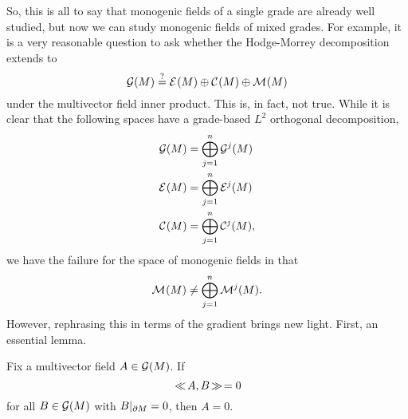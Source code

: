 So, this is all to say that monogenic fields of a single grade are already well studied, but now we can study monogenic fields of mixed grades. For example, it is a very reasonable question to ask whether the Hodge-Morrey decomposition extends to
    \begin{equation}
        \mathcal{G}(M) \stackrel{?}{=} \mathcal{E}^{}(M) \oplus \mathcal{C}^{}(M) \oplus \mathcal{M}^{}(M)
    \end{equation} 
under the multivector field inner product. This is, in fact, not true.  While it is clear that the following spaces have a grade-based $L^2$ orthogonal decomposition,
\begin{align}
    \mathcal{G}(M) &= \bigoplus_{j=1}^n \mathcal{G}^j(M)\\
    \mathcal{E}^{}(M) &= \bigoplus_{j=1}^n \mathcal{E}^{j}(M)\\
    \mathcal{C}^{}(M) &= \bigoplus_{j=1}^n \mathcal{C}^{j}(M),
\end{align}
we have the failure for the space of monogenic fields in that
\begin{equation}
    \mathcal{M}^{}(M) \neq \bigoplus_{j=1}^n \mathcal{M}^{j}(M).
\end{equation}
However, rephrasing this in terms of the gradient brings new light. First, an essential lemma.
\begin{lemma}
\label{lem:mollifier}
Fix a multivector field $A\in \mathcal{G}(M)$. If
\begin{equation}
\hspace*{.5mm}\ll \hspace*{-.5mm} A, B \hspace*{-.5mm}\gg \hspace*{.5mm} = 0
\end{equation}
for all $B\in \mathcal{G}(M)$ with $B\vert_{\partial M} =0$, then $A=0$.
\end{lemma}
